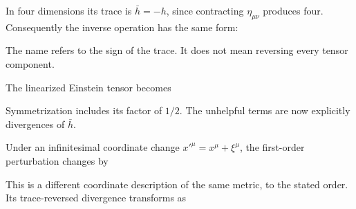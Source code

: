 \documentclass[
  11pt,
  letterpaper,
  oneside,
  openany]{scrbook}
\begin{document}
In four dimensions its trace is \(\bar h=-h\), since contracting
\(\eta_{\mu\nu}\) produces four. Consequently the inverse operation has
the same form:

\begin{center}
\begingroup
{}
\ifdim\wd\grmathbox>\linewidth
\resizebox{\linewidth}{!}{\usebox{\grmathbox}}
\else\usebox{\grmathbox}\fi
\endgroup
\end{center}

The name refers to the sign of the trace. It does not mean reversing
every tensor component.

The linearized Einstein tensor becomes

\begin{center}
\begingroup
{}
\ifdim\wd\grmathbox>\linewidth
\resizebox{\linewidth}{!}{\usebox{\grmathbox}}
\else\usebox{\grmathbox}\fi
\endgroup
\end{center}

Symmetrization includes its factor of \(1/2\). The unhelpful terms are
now explicitly divergences of \(\bar h\).

Under an infinitesimal coordinate change \(x'^\mu=x^\mu+\xi^\mu\), the
first-order perturbation changes by

\begin{center}
\begingroup
{}
\ifdim\wd\grmathbox>\linewidth
\resizebox{\linewidth}{!}{\usebox{\grmathbox}}
\else\usebox{\grmathbox}\fi
\endgroup
\end{center}

This is a different coordinate description of the same metric, to the
stated order. Its trace-reversed divergence transforms as

\begin{center}
\begingroup
{}
\ifdim\wd\grmathbox>\linewidth
\resizebox{\linewidth}{!}{\usebox{\grmathbox}}
\else\usebox{\grmathbox}\fi
\endgroup
\end{center}
\end{document}
